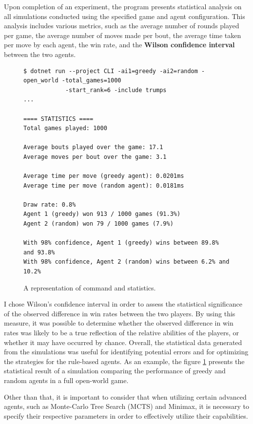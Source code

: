 Upon completion of an experiment, the program presents statistical analysis on all simulations conducted using the specified game and agent configuration. This analysis includes various metrics, such as the average number of rounds played per game, the average number of moves made per bout, the average time taken per move by each agent, the win rate, and the \textbf{Wilson confidence interval} between the two agents.

\begin{figure}[h]
\captionsetup{justification=centering}
\begin{lstlisting}
$ dotnet run --project CLI -ai1=greedy -ai2=random -open_world -total_games=1000 
			-start_rank=6 -include trumps
...

==== STATISTICS ====
Total games played: 1000

Average bouts played over the game: 17.1
Average moves per bout over the game: 3.1

Average time per move (greedy agent): 0.0201ms
Average time per move (random agent): 0.0181ms

Draw rate: 0.8%
Agent 1 (greedy) won 913 / 1000 games (91.3%)
Agent 2 (random) won 79 / 1000 games (7.9%)

With 98% confidence, Agent 1 (greedy) wins between 89.8% and 93.8% 
With 98% confidence, Agent 2 (random) wins between 6.2% and 10.2% 
\end{lstlisting}
\caption{A representation of command and statistics.}
\label{fig:statistics}
\end{figure}

I chose Wilson's confidence interval in order to assess the statistical significance of the observed difference in win rates between the two players. By using this measure, it was possible to determine whether the observed difference in win rates was likely to be a true reflection of the relative abilities of the players, or whether it may have occurred by chance. Overall, the statistical data generated from the simulations was useful for identifying potential errors and for optimizing the strategies for the rule-based agents. As an example, the figure \ref{fig:statistics}  presents the statistical result of a simulation comparing the performance of greedy and random agents in a full open-world game.

Other than that, it is important to consider that when utilizing certain advanced agents, such as Monte-Carlo Tree Search (MCTS) and Minimax, it is necessary to specify their respective parameters in order to effectively utilize their capabilities. 


